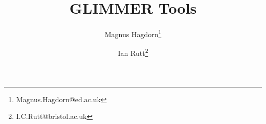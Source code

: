 \newcommand{\dir}{tg}

\pagestyle{myheadings}


\title{GLIMMER {\glimmerver} Tools}
\author{Magnus Hagdorn\thanks{Magnus.Hagdorn@ed.ac.uk} \and Ian Rutt\thanks{I.C.Rutt@bristol.ac.uk}}
\maketitle
\tableofcontents
\newpage




